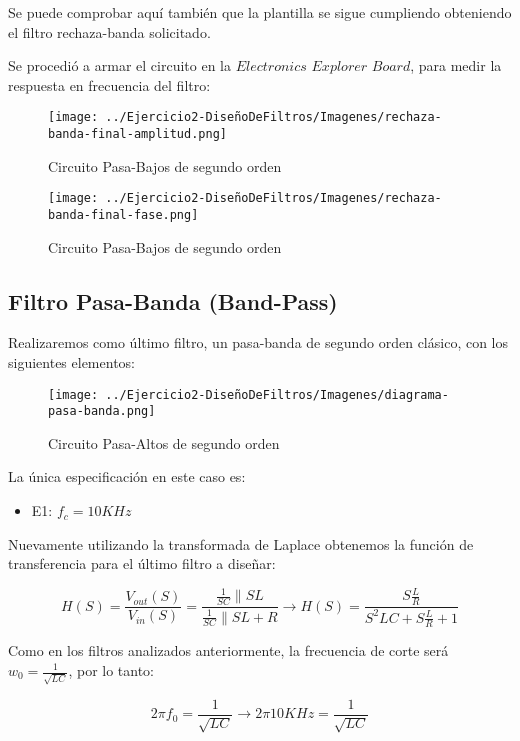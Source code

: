 Se puede comprobar aquí también que la plantilla se sigue cumpliendo obteniendo el filtro rechaza-banda solicitado.

Se procedió a armar el circuito en la $Electronics$ $Explorer$ $Board$, para medir la respuesta en frecuencia del filtro:

\begin{figure}[H]
    \centering
    \texttt{[image: ../Ejercicio2-DiseñoDeFiltros/Imagenes/rechaza-banda-final-amplitud.png]}
    \caption{Circuito Pasa-Bajos de segundo orden}
\end{figure}

\begin{figure}[H]
    \centering
    \texttt{[image: ../Ejercicio2-DiseñoDeFiltros/Imagenes/rechaza-banda-final-fase.png]}
    \caption{Circuito Pasa-Bajos de segundo orden}
\end{figure}


\subsection{Filtro Pasa-Banda (Band-Pass)}

Realizaremos como último filtro, un pasa-banda de segundo orden clásico, con los siguientes elementos:

\begin{figure}[H]
    \centering
    \texttt{[image: ../Ejercicio2-DiseñoDeFiltros/Imagenes/diagrama-pasa-banda.png]}
    \caption{Circuito Pasa-Altos de segundo orden}
\end{figure}

La única especificación en este caso es:

\begin{itemize}
	\item E1: $f_c=10 KHz$
\end{itemize}

Nuevamente utilizando la transformada de Laplace obtenemos la función de transferencia para el último filtro
a diseñar:

$$H(S)=\frac{V_{out}(S)}{V_{in}(S)}=\frac{\frac{1}{SC}\parallel SL}{\frac{1}{SC}\parallel SL + R} \longrightarrow 
H(S)=\frac{S\frac{L}{R}}{S^2LC+S\frac{L}{R}+1}$$

Como en los filtros analizados anteriormente, la frecuencia de corte
será $w_0=\frac{1}{\sqrt{LC}}$, por lo tanto:

$$2 \pi f_0 = \frac{1}{\sqrt{LC}} \longrightarrow 2 \pi 10KHz = \frac{1}{\sqrt{LC}}$$

